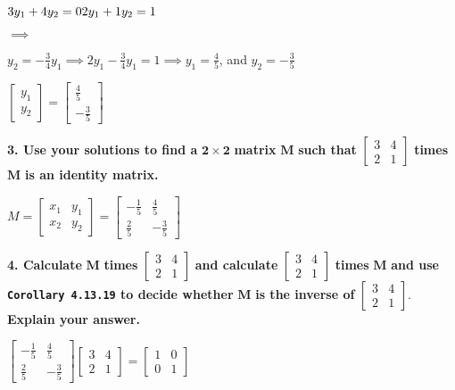 \documentclass[
  letterpaper,
  DIV=11,
  numbers=noendperiod]{scrartcl}
\begin{document}
\(3y_1 + 4y_2 = 0\\2y_1 + 1y_2 = 1\)

\(\implies\)

\(y_2 = -\frac{3}{4}y_1 \implies 2y_1 - \frac{3}{4}y_1 = 1 \implies y_1 = \frac{4}{5}\),
and \(y_2 = -\frac{3}{5}\)

\(\begin{bmatrix}y_1\\y_2\end{bmatrix} = \begin{bmatrix}\frac{4}{5}\\-\frac{3}{5}\end{bmatrix}\)

\textbf{3. Use your solutions to find a} \(\bm{2 \times 2}\)
\textbf{matrix} \(\bm{M}\) \textbf{such that}
\(\begin{bmatrix} 3 & 4 \\ 2 & 1 \end{bmatrix}\) \textbf{times}
\(\bm{M}\) \textbf{is an identity matrix.}

\(M = \begin{bmatrix}x_1 &y_1\\x_2 &y_2\end{bmatrix} = \begin{bmatrix}-\frac{1}{5} &\frac{4}{5}\\\frac{2}{5} &-\frac{3}{5}\end{bmatrix}\)

\textbf{4. Calculate} \(\bm{M}\) \textbf{times}
\(\begin{bmatrix} 3 & 4 \\ 2 & 1 \end{bmatrix}\) \textbf{and calculate}
\(\begin{bmatrix} 3 & 4 \\ 2 & 1 \end{bmatrix}\) \textbf{times}
\(\bm{M}\) \textbf{and use \texttt{Corollary\ 4.13.19} to decide
whether} \(\bm{M}\) \textbf{is the inverse of}
\(\begin{bmatrix} 3 & 4 \\ 2 & 1 \end{bmatrix}\). \textbf{Explain your
answer.}

\(\begin{bmatrix}-\frac{1}{5} &\frac{4}{5}\\\frac{2}{5} &-\frac{3}{5}\end{bmatrix} \begin{bmatrix}3 &4\\2 &1\end{bmatrix} = \begin{bmatrix}1 &0\\0 &1\end{bmatrix}\)
\end{document}
